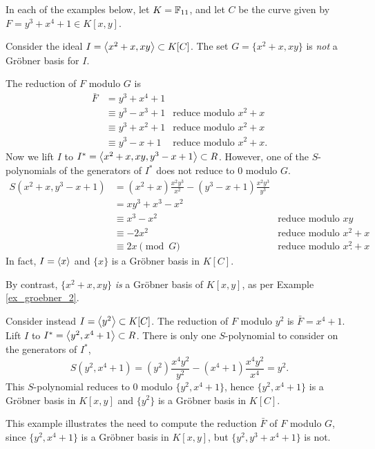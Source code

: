 In each of the examples below, let $K = \mathbb{F}_{11}$,
and let $C$ be the curve given by $F = y^3 + x^4 + 1 \in K[x,y]$.
\begin{example}
  Consider the ideal $I = \left\langle x^2 + x, xy \right\rangle \subset K[C]$.
  The set $G = \{ x^2 + x, xy \}$ is \emph{not} a Gr\"obner basis for $I$.
  
  The reduction of $F$ modulo $G$ is
  \begin{align*}
    \bar F  &= y^3 + x^4 + 1 \\
            &\equiv y^3 - x^3 + 1 & \text{reduce modulo $x^2 + x$} \\
            &\equiv y^3 + x^2 + 1 & \text{reduce modulo $x^2 + x$} \\
            &\equiv y^3 - x + 1 & \text{reduce modulo $x^2 + x$}.
  \end{align*}
  Now we lift $I$ to $I^* = \left\langle x^2 + x, xy, y^3 - x + 1 \right\rangle \subset R$.
  However, one of the $S$-polynomials of the generators of $I^*$ does not reduce to 0 modulo $G$.
  \begin{align*}
    S(x^2 + x, y^3 - x + 1)
      &= (x^2 + x)\frac{x^2y^3}{x^2} - (y^3 - x + 1)\frac{x^2y^3}{y^3} \\
      &= xy^3 + x^3 - x^2 \\
      &\equiv x^3 - x^2 & \text{reduce modulo $xy$} \\
      &\equiv -2x^2 & \text{reduce modulo $x^2 + x$} \\
      &\equiv 2x \pmod G & \text{reduce modulo $x^2 + x$}.
  \end{align*}
  In fact, $I = \left\langle x \right\rangle$ and $\{x\}$ is a Gr\"obner basis in $K[C]$.

  By contrast, $\{x^2 + x, xy\}$ \emph{is} a Gr\"obner basis of $K[x,y]$,
  as per Example \ref{ex_groebner_2}.
\end{example}
\begin{example}
  Consider instead $I = \left\langle y^2 \right\rangle \subset K[C]$.
  The reduction of $F$ modulo $y^2$ is $\bar F = x^4 + 1$.
  Lift $I$ to $I^* = \left\langle y^2, x^4 + 1 \right\rangle \subset R$.
  There is only one $S$-polynomial to consider on the generators of $I^*$,
  \[ S(y^2, x^4 + 1) = (y^2) \frac{x^4y^2}{y^2} - (x^4 + 1)\frac{x^4y^2}{x^4} = y^2. \]
  This $S$-polynomial reduces to 0 modulo $\{y^2, x^4 + 1\}$,
  hence $\{y^2, x^4 + 1\}$ is a Gr\"obner basis in $K[x,y]$ and $\{y^2\}$ is a Gr\"obner basis in $K[C]$.
  
  This example illustrates the need to compute the reduction $\bar F$ of $F$ modulo $G$,
  since $\{y^2, x^4 + 1\}$ is a Gr\"obner basis in $K[x,y]$, but $\{y^2, y^3 + x^4 + 1\}$ is not.
\end{example}

